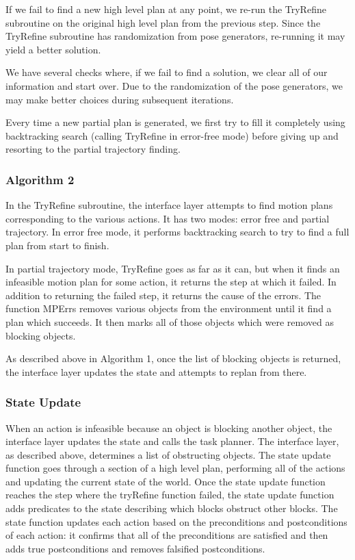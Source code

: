 \documentclass[12pt]{article}
\begin{document}
If we fail to find a new high level plan at any point, we re-run the TryRefine subroutine on the original high level plan from the previous step.  
Since the TryRefine subroutine has randomization from pose generators, re-running it may yield a better solution. 

We have several checks where, if we fail to find a solution, we clear all of our information and start over.  
Due to the randomization of the pose generators, we may make better choices during subsequent iterations.  

Every time a new partial plan is generated, we first try to fill it completely using backtracking search (calling TryRefine in error-free mode) before giving up and resorting to the partial trajectory finding.  

\subsubsection{Algorithm 2}


In the TryRefine subroutine, the interface layer attempts to find motion plans corresponding to the various actions.  
It has two modes: error free and partial trajectory.  
In error free mode, it performs backtracking search to try to find a full plan from start to finish.  

In partial trajectory mode, TryRefine goes as far as it can, but when it finds an infeasible motion plan for some action, it returns the step at which it failed.  
In addition to returning the failed step, it returns the cause of the errors.  
The function MPErrs removes various objects from the environment until it find a plan which succeeds.  
It then marks all of those objects which were removed as blocking objects.

As described above in Algorithm 1, once the list of blocking objects is returned, the interface layer updates the state and attempts to replan from there.

\subsubsection{State Update}


When an action is infeasible because an object is blocking another object, the interface layer updates the state and calls the task planner. 
The interface layer, as described above, determines a list of obstructing objects.
The state update function goes through a section of a high level plan, performing all of the actions and updating the current state of the world.
Once the state update function reaches the step where the tryRefine function failed, the state update function adds predicates to the state describing which blocks obstruct other blocks.
The state function updates each action based on the preconditions and postconditions of each action: it confirms that all of the preconditions are satisfied and then adds true postconditions and removes falsified postconditions.  
\end{document}
